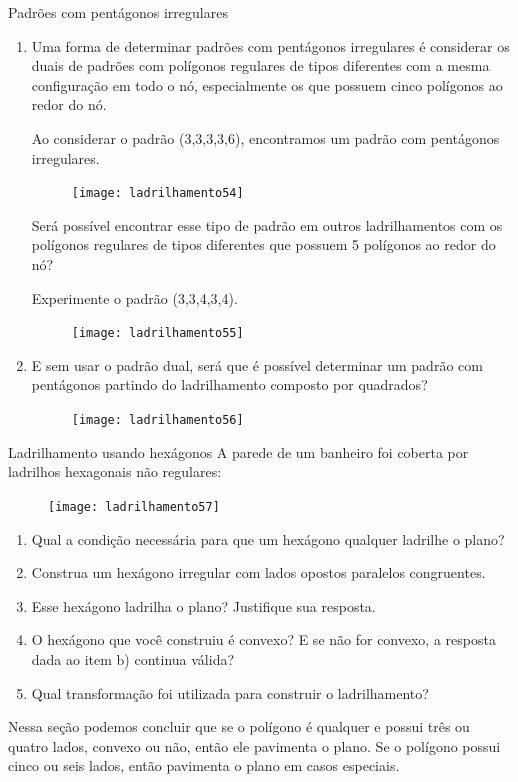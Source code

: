 \begin{task}{Padrões com pentágonos irregulares}

\begin{enumerate}

\item Uma forma de determinar padrões com pentágonos irregulares é considerar os duais de padrões com polígonos regulares de tipos diferentes com a mesma configuração em todo o nó, especialmente os que possuem cinco polígonos ao redor do nó.

Ao considerar o padrão (3,3,3,3,6), encontramos um padrão com pentágonos irregulares.

\begin{figure}[H]
	\centering
	\texttt{[image: ladrilhamento54]}

\end{figure}

Será possível encontrar esse tipo de padrão em outros ladrilhamentos com os polígonos regulares de tipos diferentes que possuem 5 polígonos ao redor do nó?

	Experimente o padrão (3,3,4,3,4).

	\begin{figure}[H]
	\centering
	\texttt{[image: ladrilhamento55]}

	\end{figure}

\item 	E sem usar o padrão dual, será que é possível determinar um padrão com pentágonos partindo do ladrilhamento composto por quadrados?

	\begin{figure}[H]
	\centering
	\texttt{[image: ladrilhamento56]}

	\end{figure}
\end{enumerate}
\end{task}

\begin{task}{Ladrilhamento usando hexágonos}
A parede de um banheiro foi coberta por ladrilhos hexagonais não regulares:

	\begin{figure}[H]
	\centering
	\texttt{[image: ladrilhamento57]}

	\end{figure}
	\begin{enumerate}
		\item Qual a condição necessária para que um hexágono qualquer ladrilhe o plano?
		\item Construa um hexágono irregular com lados opostos paralelos congruentes.
		\item Esse hexágono ladrilha o plano? Justifique sua resposta.
		\item O hexágono que você construiu é convexo? E se não for convexo, a resposta dada ao item b) continua válida?
		\item Qual transformação foi utilizada para construir o ladrilhamento?
	\end{enumerate}
\end{task}


Nessa seção podemos concluir que se o polígono é qualquer e possui três ou quatro lados, convexo ou não, então ele pavimenta o plano. Se o polígono possui cinco ou seis lados, então pavimenta o plano em casos especiais.

\newpage

